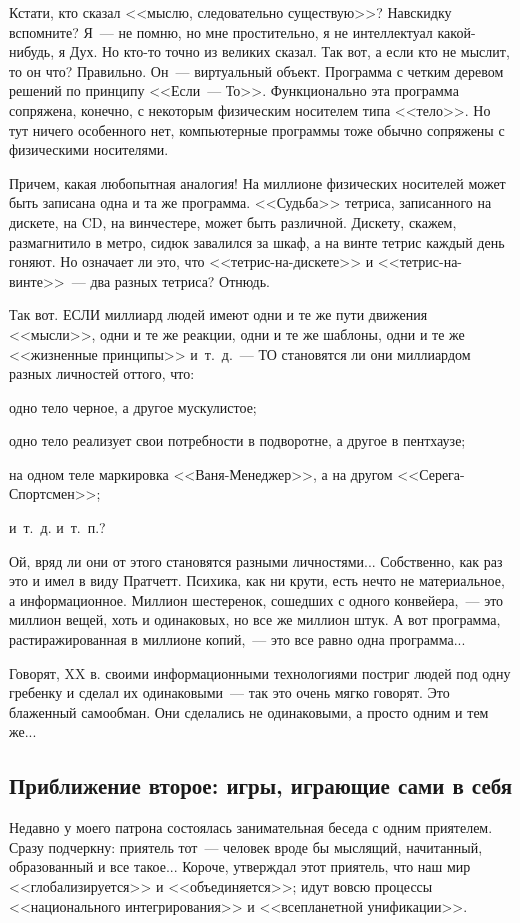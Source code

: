 \documentclass{scrbook}
\newcommand{\flqq}{<<}
\newcommand{\frqq}{>>}
\newcommand{\mdash}{~--- }
\newcommand{\commamdash}{~--- } %
\newcommand{\essaysection}[1]{\subsection*{#1}\nopagebreak}
\begin{document}
Кстати, кто сказал {\flqq}мыслю, следовательно существую{\frqq}? Навскидку вспомните? Я{\mdash}не помню, но мне простительно, я не интеллектуал какой-нибудь, я Дух. Но кто-то точно из великих сказал. Так вот, а если кто не мыслит, то он что? Правильно. Он{\mdash}виртуальный объект. Программа с четким деревом решений по принципу {\flqq}Если{\mdash}То{\frqq}. Функционально эта программа сопряжена, конечно, с некоторым физическим носителем типа {\flqq}тело{\frqq}. Но тут ничего особенного нет, компьютерные программы тоже обычно сопряжены с физическими носителями.

Причем, какая любопытная аналогия! На миллионе физических носителей может быть записана одна и та же программа. {\flqq}Судьба{\frqq} тетриса, записанного на дискете, на CD, на винчестере, может быть различной. Дискету, скажем, размагнитило в метро, сидюк завалился за шкаф, а на винте тетрис каждый день гоняют. Но означает ли это, что {\flqq}тетрис-на-дискете{\frqq} и {\flqq}тетрис-на-винте{\frqq}{\mdash}два разных тетриса? Отнюдь.

Так вот. ЕСЛИ миллиард людей имеют одни и те же пути движения {\flqq}мысли{\frqq}, одни и те же реакции, одни и те же шаблоны, одни и те же {\flqq}жизненные принципы{\frqq} и~т.~д.{\mdash} ТО становятся ли они миллиардом разных личностей оттого, что:

одно тело черное, а другое мускулистое;

одно тело реализует свои потребности в подворотне, а другое в пентхаузе;

на одном теле маркировка {\flqq}Ваня-Менеджер{\frqq}, а на другом {\flqq}Серега-Спортсмен{\frqq};

и~т.~д. и~т.~п.?

Ой, вряд ли они от этого становятся разными личностями... Собственно, как раз это и имел в виду Пратчетт. Психика, как ни крути, есть нечто не материальное, а информационное. Миллион шестеренок, сошедших с одного конвейера,{\commamdash}это миллион вещей, хоть и одинаковых, но все же миллион штук. А вот программа, растиражированная в миллионе копий,{\commamdash}это все равно одна программа...

Говорят, XX в. своими информационными технологиями постриг людей под одну гребенку и сделал их одинаковыми{\mdash}так это очень мягко говорят. Это блаженный самообман. Они сделались не одинаковыми, а просто одним и тем же...

\essaysection{Приближение второе: игры, играющие сами в себя}

Недавно у моего патрона состоялась занимательная беседа с одним приятелем. Сразу подчеркну: приятель тот{\mdash}человек вроде бы мыслящий, начитанный, образованный и все такое... Короче, утверждал этот приятель, что наш мир {\flqq}глобализируется{\frqq} и {\flqq}объединяется{\frqq}; идут вовсю процессы {\flqq}национального интегрирования{\frqq} и {\flqq}всепланетной унификации{\frqq}.
\end{document}
